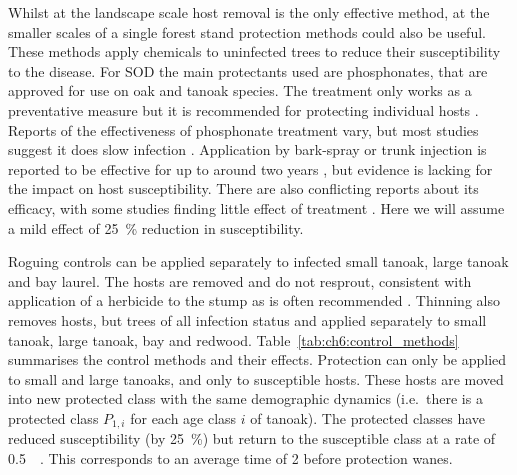 Whilst at the landscape scale host removal is the only effective method, at the smaller scales of a single forest stand protection methods could also be useful. These methods apply chemicals to uninfected trees to reduce their susceptibility to the disease. For SOD the main protectants used are phosphonates, that are approved for use on oak and tanoak species. The treatment only works as a preventative measure but it is recommended for protecting individual hosts \citep{lee_protecting_2010}. Reports of the effectiveness of phosphonate treatment vary, but most studies suggest it does slow infection \citep{swiecki_reference_2013}. Application by bark-spray or trunk injection is reported to be effective for up to around two years \citep{garbelotto_phosphonate_2009}, but evidence is lacking for the impact on host susceptibility. There are also conflicting reports about its efficacy, with some studies finding little effect of treatment \citep{kanaskie_application_2011}. Here we will assume a mild effect of \SI{25}{\percent} reduction in susceptibility.

Roguing controls can be applied separately to infected small tanoak, large tanoak and bay laurel. The hosts are removed and do not resprout, consistent with application of a herbicide to the stump as is often recommended \citep{swiecki_reference_2013}. Thinning also removes hosts, but trees of all infection status and applied separately to small tanoak, large tanoak, bay and redwood. Table~\ref{tab:ch6:control_methods} summarises the control methods and their effects. Protection can only be applied to small and large tanoaks, and only to susceptible hosts. These hosts are moved into new protected class with the same demographic dynamics (i.e.\ there is a protected class $P_{1,i}$ for each age class $i$ of tanoak). The protected classes have reduced susceptibility (by \SI{25}{\percent}) but return to the susceptible class at a rate of \SI{0.5}{\per\year}. This corresponds to an average time of \SI{2}{\years} before protection wanes.

